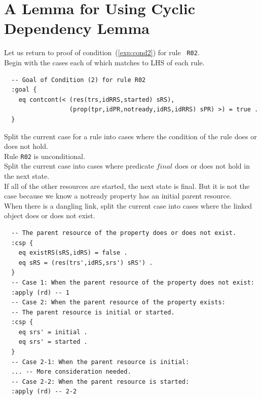 \documentclass[12pt]{report}
\begin{document}
\section{A Lemma for Using Cyclic Dependency Lemma}
\label{sec:initialcont}
Let us return to proof of condition~(\ref{exp:cond2}) for rule {\tt
  R02}.\\

 Begin with the cases each of which matches to
LHS of each rule.
\small
\begin{verbatim}
  -- Goal of Condition (2) for rule R02
  :goal {
    eq contcont(< (res(trs,idRRS,started) sRS),
                  (prop(tpr,idPR,notready,idRS,idRRS) sPR) >) = true .
  }
\end{verbatim}
\normalsize
 Split the current case for a rule into
cases where the condition of the rule does or does not hold. \\
Rule {\tt R02} is unconditional.\\
 Split the current case into cases where
predicate $final$ does or does not hold in the next state.\\
If all of the other resources are started, the next state is final.
But it is not the case because we know a notready property has
an initial parent resource. \\
 When there is a dangling link, split the
current case into cases where the linked object does or does not
exist.
\small
\begin{verbatim}
  -- The parent resource of the property does or does not exist.
  :csp {
    eq existRS(sRS,idRS) = false .
    eq sRS = (res(trs',idRS,srs') sRS') .
  }
  -- Case 1: When the parent resource of the property does not exist:
  :apply (rd) -- 1
  -- Case 2: When the parent resource of the property exists:
  -- The parent resource is initial or started.
  :csp {
    eq srs' = initial .
    eq srs' = started .
  }
  -- Case 2-1: When the parent resource is initial:
  ... -- More consideration needed.
  -- Case 2-2: When the parent resource is started:
  :apply (rd) -- 2-2
\end{verbatim}
\normalsize
\end{document}
